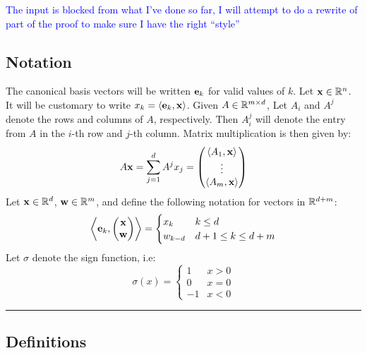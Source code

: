 \documentclass[a4,fleqn]{article}
\begin{document}
\textcolor{blue}{The input is blocked from what I've done so far, I will attempt to do a rewrite of part of the proof to make sure I have the right ``style''}

\newcommand{\bset}[1]{\left\{#1\right\}}
\newcommand{\hcone}[1]{\bset{\x \in \R^d \suchthat #1\x \leq \vec{0}}}
\newcommand{\vcone}[1]{\bset{\x \in \R^d \suchthat 
                            \exists \t \in\R^n\geq \vec{0},\, \x = #1\t}}
\newcommand{\mdef}[3]{#1 \in \R^{#2 \times #3}}
\newcommand{\hplane}[2]{\bset{\x \in \R^{#1} \suchthat x_{#2} = 0}}
\newcommand{\svec}[2]{\begin{pmatrix*}[c] #1 \\ #2 \end{pmatrix*}}

\newcommand{\uvsum}{\sum_{\substack{ \u \in U \\ \v \in V }}}

\subsection{Notation}  
The canonical basis vectors will be written $\mathbf{e}_k$ for valid values of $k$.  Let $\mathbf{x} \in \mathbb{R}^n$.  It will be customary to write $x_k = \left\langle \mathbf{e}_k, \mathbf{x} \right\rangle$.  Given $\mdef{A}{m}{d}$, Let $A_i$ and $A^j$ denote the rows and columns of $A$, respectively.  Then $A^j_i$ will denote the entry from $A$ in the $i$-th row and $j$-th column.  Matrix multiplication is then given by:
\[ A\mathbf{x} = \sum_{j=1}^{d} A^j x_j = 
  \begin{pmatrix} 
    \left\langle A_1, \mathbf{x} \right\rangle \\ \vdots \\ \left\langle A_m, \mathbf{x} \right\rangle
  \end{pmatrix}
\]
Let $\mathbf{x} \in \mathbb{R}^d$, $\mathbf{w} \in \mathbb{R}^m$, and define the following notation for vectors in $\mathbb{R}^{d+m}$:
\begin{align*}
  \dotproduct{\e_k}{\svec{\x}{\w}} = 
    \begin{cases} x_k     & k \leq d \\
                  w_{k-d} & d+1 \leq k \leq d+m
    \end{cases}
\end{align*}
Let $\sigma$ denote the sign function, i.e:
\[ \sigma(x) = \begin{cases} 1 & x > 0 \\ 0 & x = 0 \\ -1 & x < 0 \end{cases} \]
\hrule \bigskip

\subsection {Definitions}
\end{document}
